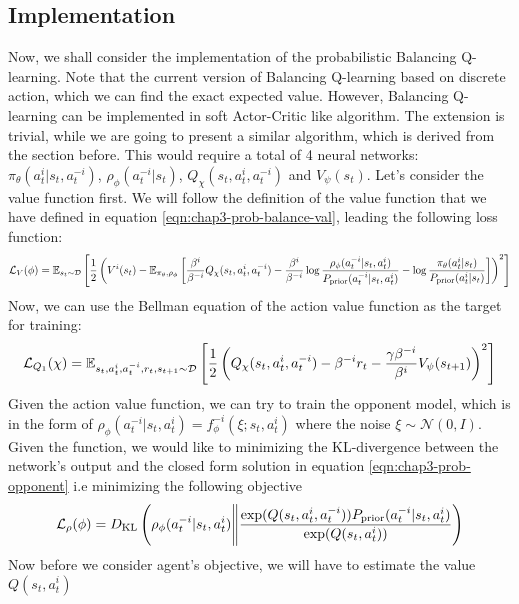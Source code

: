 \subsection{Implementation}
Now, we shall consider the implementation of the probabilistic Balancing Q-learning. Note that the current version of Balancing Q-learning based on discrete action, which we can find the exact expected value. However, Balancing Q-learning can be implemented in soft Actor-Critic like algorithm. The extension is trivial, while we are going to present a similar algorithm, which is derived from the section before. This would require a total of 4 neural networks: $\pi_\theta(a^i_t | s_t, a^{-i}_t)$, $\rho_\phi(a^{-i}_t | s_t)$, $Q_\chi(s_t, a^i_t, a^{-i}_t)$ and $V_\psi(s_t)$. Let's consider the value function first. We will follow the definition of the value function that we have defined in equation \ref{eqn:chap3-prob-balance-val}, leading the following loss function:
\begin{equation}
    \mathcal{L}_V(\phi) = \mathbb{E}_{s_t \sim \mathcal{D}} \left[ \frac{1}{2}\left( V^i(s_t) - \mathbb{E}_{\pi_\theta, \rho_\phi}\left[ \frac{\beta^{i}}{\beta^{-i}} Q_\chi(s_t, a^i_t, a^{-i}_t) - \frac{\beta^{i}}{\beta^{-i}}\log\frac{\rho_\phi(a^{-i}_t | s_t, a^i_t)}{P_{\text{prior}}( a^{-i}_t| s_t, a^i_t)} - \log \frac{\pi_\theta(a^{i}_t | s_t)}{P_{\text{prior}}(a^{i}_t | s_t)} \right]  \right)^2 \right]
\end{equation}
Now, we can use the Bellman equation of the action value function as the target for training:
\begin{equation}
    \mathcal{L}_{Q_1}(\chi) = \mathbb{E}_{s_t, a^{i}_t, a^{-i}_t, r_t, s_{t+1} \sim \mathcal{D}}\left[ \frac{1}{2}\left( Q_\chi(s_t, a^{i}_t, a^{-i}_t) - \beta^{-i} r_t - \frac{\gamma\beta^{-i}}{\beta^i}V_\psi(s_{t+1})      \right)^2 \right]
\end{equation}
Given the action value function, we can try to train the opponent model, which is in the form of $\rho_\phi(a^{-i}_t | s_t, a^i_t) = f^{-i}_\phi(\xi ; s_t, a^i_t)$ where the noise $\xi \sim \mathcal{N}(0, I)$. Given the function, we would like to minimizing the KL-divergence between the network's output and the closed form solution in equation \ref{eqn:chap3-prob-opponent} i.e minimizing the following objective 
\begin{equation}
    \mathcal{L}_\rho(\phi) = D_{\mathrm{KL}}\left( \rho_{\phi}(a^{-i}_t | s_t, a^i_t) \Bigg\| \frac{\exp(Q(s_t, a^i_t, a^{-i}_t))P_{\text{prior}}(a^{-i}_t | s_t, a^i_t)}{\exp(Q(s_t, a^{i}_t))} \right)
\end{equation}
Now before we consider agent's objective, we will have to estimate the value $Q(s_t, a^{i}_t)$
